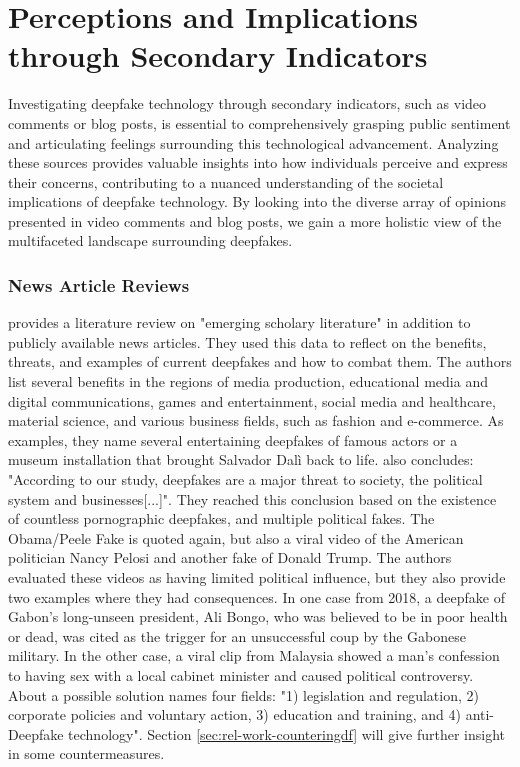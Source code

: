 \documentclass[
  a4paper,  %
  twoside,  %
  bibliography=totoc,
  headsepline,
  cleardoublepage=empty,
  parskip=half,
  draft=false
]{scrbook}
\begin{document}
\section{Perceptions and Implications through Secondary Indicators} 
\label{sec:rel-secondary}

Investigating deepfake technology through secondary indicators, such as video comments or blog posts, is essential to comprehensively grasping public sentiment and articulating feelings surrounding this technological advancement. Analyzing these sources provides valuable insights into how individuals perceive and express their concerns, contributing to a nuanced understanding of the societal implications of deepfake technology. By looking into the diverse array of opinions presented in video comments and blog posts, we gain a more holistic view of the multifaceted landscape surrounding deepfakes.

\subsubsection*{News Article Reviews}
\citet{westerlundEmergenceDeepfakeTechnology2019a} provides a literature review on "emerging scholary literature" in addition to publicly available news articles. They used this data to reflect on the benefits, threats, and examples of current deepfakes and how to combat them. The authors list several benefits in the regions of media production, educational media and digital communications, games and entertainment, social media and healthcare, material science, and various business fields, such as fashion and e-commerce. As examples, they name several entertaining deepfakes of famous actors or a museum installation that brought Salvador Dalì back to life.  also concludes: "According to our study, deepfakes are a major threat to society, the political system and businesses[...]". They reached this conclusion based on the existence of countless pornographic deepfakes, and multiple political fakes. The Obama/Peele Fake is quoted again, but also a viral video of the American politician Nancy Pelosi and another fake of Donald Trump. The authors evaluated these videos as having limited political influence, but they also provide two examples where they had consequences. In one case from 2018, a deepfake of Gabon's long-unseen president, Ali Bongo, who was believed to be in poor health or dead, was cited as the trigger for an unsuccessful coup by the Gabonese military. In the other case, a viral clip from Malaysia showed a man's confession to having sex with a local cabinet minister and caused political controversy. \\
About a possible solution  names four fields: "1) legislation and regulation, 2) corporate policies and voluntary action, 3) education and training, and 4) anti-Deepfake technology". Section \ref{sec:rel-work-counteringdf} will give further insight in some countermeasures.
\end{document}
